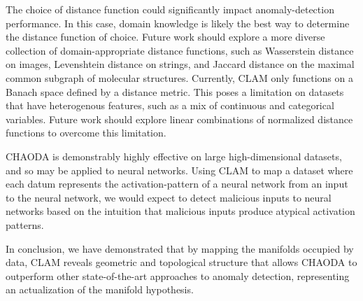 The choice of distance function could significantly impact anomaly-detection performance.
In this case, domain knowledge is likely the best way to determine the distance function of choice.
Future work should explore a more diverse collection of domain-appropriate distance functions, such as Wasserstein distance on images, Levenshtein distance on strings, and Jaccard distance on the maximal common subgraph of molecular structures.
Currently, CLAM only functions on a Banach space defined by a distance metric.
This poses a limitation on datasets that have heterogenous features, such as a mix of continuous and categorical variables.
Future work should explore linear combinations of normalized distance functions to overcome this limitation.

CHAODA is demonstrably highly effective on large high-dimensional datasets, and so may be applied to neural networks.
Using CLAM to map a dataset where each datum represents the activation-pattern of a neural network from an input to the neural network, we would expect to detect malicious inputs to neural networks based on the intuition that malicious inputs produce atypical activation patterns.

In conclusion, we have demonstrated that by mapping the manifolds occupied by data, CLAM reveals geometric and topological structure that allows CHAODA to outperform other state-of-the-art approaches to anomaly detection, representing an actualization of the manifold hypothesis.
